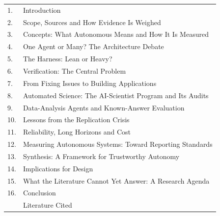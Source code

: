 {\footnotesize\setlength{\tabcolsep}{0pt}
\begin{tabular}{@{}l@{\hspace{4pt}}>{\raggedright\arraybackslash}p{\dimexpr\linewidth-14pt}@{}}
1. & Introduction\\[1pt]
2. & Scope, Sources and How Evidence Is Weighed\\[1pt]
3. & Concepts: What Autonomous Means and How It Is Measured\\[1pt]
4. & One Agent or Many? The Architecture Debate\\[1pt]
5. & The Harness: Lean or Heavy?\\[1pt]
6. & Verification: The Central Problem\\[1pt]
7. & From Fixing Issues to Building Applications\\[1pt]
8. & Automated Science: The AI-Scientist Program and Its Audits\\[1pt]
9. & Data-Analysis Agents and Known-Answer Evaluation\\[1pt]
10. & Lessons from the Replication Crisis\\[1pt]
11. & Reliability, Long Horizons and Cost\\[1pt]
12. & Measuring Autonomous Systems: Toward Reporting Standards\\[1pt]
13. & Synthesis: A Framework for Trustworthy Autonomy\\[1pt]
14. & Implications for Design\\[1pt]
15. & What the Literature Cannot Yet Answer: A Research Agenda\\[1pt]
16. & Conclusion\\[1pt]
 & Literature Cited\\
\end{tabular}}
